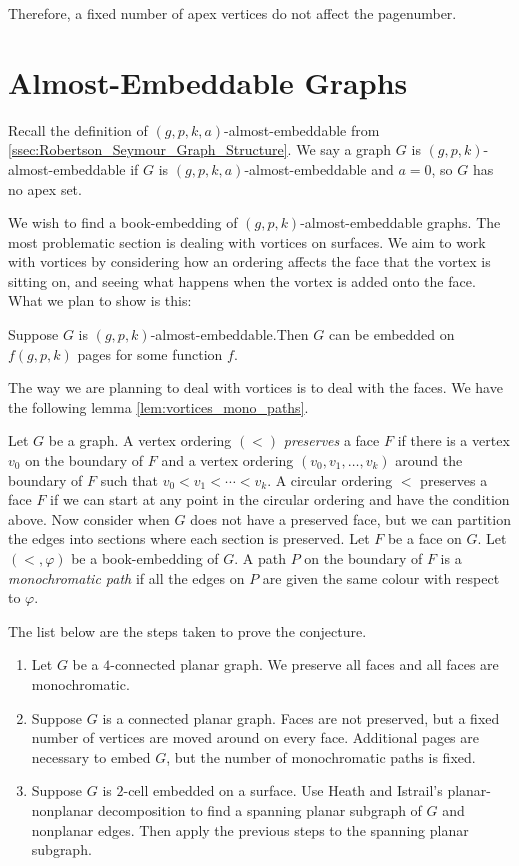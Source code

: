 Therefore, a fixed number of apex vertices do not affect the pagenumber.

\section{Almost-Embeddable Graphs}
Recall the definition of $(g, p, k, a)$-almost-embeddable from \cref{ssec:Robertson_Seymour_Graph_Structure}. We say a graph $G$ is $(g, p, k)$-almost-embeddable if $G$ is $(g, p, k, a)$-almost-embeddable and $a = 0$, so $G$ has no apex set.

We wish to find a book-embedding of $(g, p, k)$-almost-embeddable graphs.
The most problematic section is dealing with vortices on surfaces.
We aim to work with vortices by considering how an ordering affects the face that the vortex is sitting on, and seeing what happens when the vortex is added onto the face.
What we plan to show is this:
\begin{conjecture}
	Suppose $G$ is $(g, p, k)$-almost-embeddable.Then $G$ can be embedded on \(f(g, p, k)\) pages for some function $f$.
\end{conjecture}
The way we are planning to deal with vortices is to deal with the faces. We have the following lemma \cref{lem:vortices_mono_paths}. 

Let \(G\) be a graph. A vertex ordering \((<)\) \textit{preserves} a face \(F\) if there is a vertex \(v_0\) on the boundary of \(F\) and a vertex ordering \((v_0, v_1, \ldots, v_k)\) around the boundary of \(F\) such that \(v_0 < v_1 < \cdots < v_k\).
A circular ordering \(<\) preserves a face \(F\) if we can start at any point in the circular ordering and have the condition above.
Now consider when \(G\) does not have a preserved face, but we can partition the edges into sections where each section is preserved. Let \(F\) be a face on \(G\). Let \( (<, \varphi) \) be a book-embedding of \(G\). A path \(P\) on the boundary of \(F\) is a \textit{monochromatic path} if all the edges on \(P\) are given the same colour with respect to \( \varphi \). 

The list below are the steps taken to prove the conjecture.
\begin{enumerate}
	\item Let $G$ be a \(4\)-connected planar graph. We preserve all faces and all faces are monochromatic.
	\item Suppose \(G\) is a connected planar graph. Faces are not preserved, but a fixed number of vertices are moved around on every face. Additional pages are necessary to embed $G$, but the number of monochromatic paths is fixed. 
	\item Suppose \(G\) is $2$-cell embedded on a surface. Use Heath and Istrail's \cite{heathPagenumberGenusGraphs1992} planar-nonplanar decomposition to find a spanning planar subgraph of $G$ and nonplanar edges. Then apply the previous steps to the spanning planar subgraph.
\end{enumerate}

